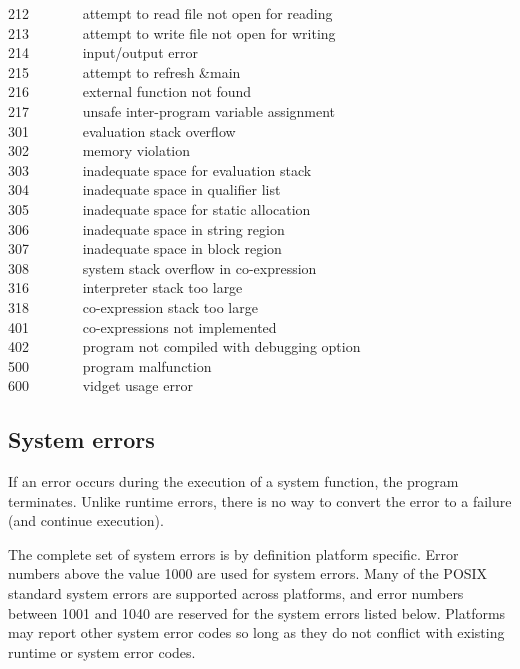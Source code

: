 212 \ \ \ \ \ \ \ attempt to read file not open for reading\\
213 \ \ \ \ \ \ \ attempt to write file not open for writing\\
214 \ \ \ \ \ \ \ input/output error\\
215 \ \ \ \ \ \ \ attempt to refresh \&main\\
216 \ \ \ \ \ \ \ external function not found\\
217 \ \ \ \ \ \ \ unsafe inter-program variable assignment\\
301 \ \ \ \ \ \ \ evaluation stack overflow\\
302 \ \ \ \ \ \ \ memory violation\\
303 \ \ \ \ \ \ \ inadequate space for evaluation stack\\
304 \ \ \ \ \ \ \ inadequate space in qualifier list\\
305 \ \ \ \ \ \ \ inadequate space for static allocation\\
306 \ \ \ \ \ \ \ inadequate space in string region\\
307 \ \ \ \ \ \ \ inadequate space in block region\\
308 \ \ \ \ \ \ \ system stack overflow in co-expression\\
316 \ \ \ \ \ \ \ interpreter stack too large\\
318 \ \ \ \ \ \ \ co-expression stack too large\\
401 \ \ \ \ \ \ \ co-expressions not implemented\\
402 \ \ \ \ \ \ \ program not compiled with debugging option\\
500 \ \ \ \ \ \ \ program malfunction\\
600 \ \ \ \ \ \ \ vidget usage error

\subsection*{System errors}

If an error occurs during the execution of a system
function, the program terminates. Unlike runtime errors, there is no way
to convert the error to a failure (and continue execution).

The complete set of system errors is by definition platform
specific. Error numbers above the value 1000 are used for system errors. Many of
the POSIX standard system errors are supported across platforms, and error
numbers between 1001 and 1040 are reserved for the system errors listed
below. Platforms may report other system error codes so long as they do not
conflict with existing runtime or system error codes.


